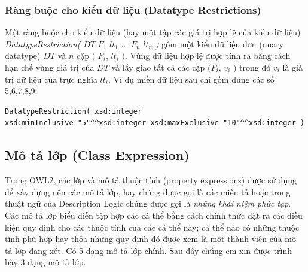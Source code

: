 \subsubsection{Ràng buộc cho kiểu dữ liệu (Datatype Restrictions)}
Một ràng buộc cho kiểu dữ liệu (hay một tập các giá trị hợp lệ của kiễu dữ liệu) \textit{DatatypeRestriction(} $DT$ $F_{1}$ $lt_{1}$ ... $F_{n}$ $lt_{n}$ \textit{ )} gồm một kiểu dữ liệu đơn (unary datatype) $DT$ và $n$ cặp $($ $F_{i}$, $lt_{i}$ $)$. Vùng dữ liệu hợp lệ được tính ra bằng cách hạn chế vùng giá trị của $DT$ và lấy giao tất cả các cặp $(F_{i}$, $v_{i}$ $)$ trong đó $v_{i}$ là giá trị dữ liệu của trực nghĩa $lt_{i}$. Ví dụ miền dữ liệu sau chỉ gồm đúng các số 5,6,7,8,9:
\begin{verbatim}
DatatypeRestriction( xsd:integer 
xsd:minInclusive "5"^^xsd:integer xsd:maxExclusive "10"^^xsd:integer )
\end{verbatim}

\subsection{Mô tả lớp (Class Expression)}
Trong OWL2, các lớp và mô tả thuộc tính (property expressions) được sử dụng để xây dựng nên các mô tả lớp, hay chúng được gọi là các miêu tả hoặc trong thuật ngữ của Description Logic chúng được gọi là \textit{những khái niệm phức tạp}. Các mô tả lớp biểu diễn tập hợp các cá thể bằng cách chính thức đặt ra các điều kiện quy định cho các thuộc tính của các cá thể này; cá thể nào có những thuộc tính phù hợp hay thỏa những quy định đó được xem là một thành viên của mô tả lớp đang xét. Có 5 dạng mô tả lớp chính. Sau đây chúng em xin được trình bày 3 dạng mô tả lớp.


